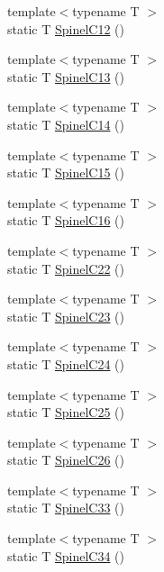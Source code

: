 \begin{DoxyCompactItemize}
{\footnotesize template$<$typename T $>$ }\\static T \mbox{\hyperlink{namespacempc_1_1data_a47095ac1f8a62911de507d88df59600b}{Spinel\+C12}} ()
\item 
{\footnotesize template$<$typename T $>$ }\\static T \mbox{\hyperlink{namespacempc_1_1data_af2ef4ab22eac3cd23bfa97027392c9a0}{Spinel\+C13}} ()
\item 
{\footnotesize template$<$typename T $>$ }\\static T \mbox{\hyperlink{namespacempc_1_1data_ace376a7c6b55479470922e49884f15f6}{Spinel\+C14}} ()
\item 
{\footnotesize template$<$typename T $>$ }\\static T \mbox{\hyperlink{namespacempc_1_1data_a68e8cc8dea549fcef1de70ecc28e6572}{Spinel\+C15}} ()
\item 
{\footnotesize template$<$typename T $>$ }\\static T \mbox{\hyperlink{namespacempc_1_1data_adc3e58f1b889c8210df5ba20e3e2788c}{Spinel\+C16}} ()
\item 
{\footnotesize template$<$typename T $>$ }\\static T \mbox{\hyperlink{namespacempc_1_1data_a90a328adecd1aeec8dbba1cd7706067f}{Spinel\+C22}} ()
\item 
{\footnotesize template$<$typename T $>$ }\\static T \mbox{\hyperlink{namespacempc_1_1data_a169d37bd87f004a14785f3e54f16a905}{Spinel\+C23}} ()
\item 
{\footnotesize template$<$typename T $>$ }\\static T \mbox{\hyperlink{namespacempc_1_1data_a5c6c5541db89218df3b498ac10172a48}{Spinel\+C24}} ()
\item 
{\footnotesize template$<$typename T $>$ }\\static T \mbox{\hyperlink{namespacempc_1_1data_ab708cfdd534861ef94710f9cc0fef33e}{Spinel\+C25}} ()
\item 
{\footnotesize template$<$typename T $>$ }\\static T \mbox{\hyperlink{namespacempc_1_1data_a4b75eb7b50dd2cfdca2878244a53d82f}{Spinel\+C26}} ()
\item 
{\footnotesize template$<$typename T $>$ }\\static T \mbox{\hyperlink{namespacempc_1_1data_abaa9a86c3126106021b32316c10b3c4d}{Spinel\+C33}} ()
\item 
{\footnotesize template$<$typename T $>$ }\\static T \mbox{\hyperlink{namespacempc_1_1data_a6e6007ab3acf15f9566f89cbd47d2a4a}{Spinel\+C34}} ()

\end{DoxyCompactItemize}

